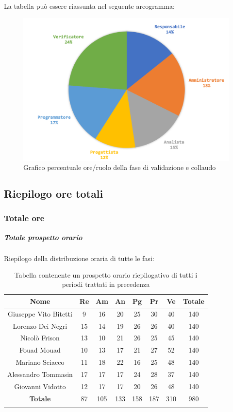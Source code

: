 		La tabella può essere riassunta nel seguente areogramma:
		\begin{figure}[H]
			\centering
			\includegraphics[width=0.8\linewidth]{./images/preventivo/validColl2.png}
			\caption{Grafico percentuale ore/ruolo della fase di validazione e collaudo}
			\label{fig:grafico costi ruolo fase di validazione e collaudo}
		\end{figure}		
		

		
	\subsection{Riepilogo ore totali}
		\subsubsection{Totale ore}
			\subparagraph{Totale prospetto orario }
			Riepilogo della distribuzione oraria di tutte le fasi:
			\begin{longtable}{|c|c|c|c|c|c|c|c|}
				\hline
				\rowcolor{lighter-grayer}
				\textbf{Nome} & \textbf{Re} & \textbf{Am} & \textbf{An} & \textbf{Pg}  & \textbf{Pr}   & \textbf{Ve} & \textbf{Totale} \\
				\hline
				\endfirsthead
				
				\hline
				Giuseppe Vito Bitetti 		& 9 & 16 & 20 & 25 & 30 & 40 & 140\\
				\hline
				\hline
				Lorenzo Dei Negri			& 15 & 14 & 19 & 26 & 26 & 40 & 140\\
				\hline
				\hline
				Nicolò Frison				    & 13 & 10 & 21 &26 & 25 & 45 & 140\\
				\hline
				\hline
				Fouad Mouad 				 & 10 & 13 & 17 & 21 & 27 & 52 & 140\\
				\hline
				\hline
				Mariano Sciacco 			& 11 & 18 & 22 & 16 & 25 & 48 & 140\\
				\hline
				\hline
				Alessandro Tommasin    & 17 & 17 & 17 & 24 & 28 & 37 & 140\\
				\hline
				\hline
				Giovanni Vidotto 			 & 12 & 17 & 17 & 20 & 26 & 48 & 140\\
				\hline 
				\textbf{Totale}				 & 87 & 105 & 133 & 158 & 187 & 310 & 980\\
				\hline
				\caption{Tabella contenente un prospetto orario riepilogativo di tutti i periodi trattati in precedenza}
			\end{longtable}
			\pagebreak
			
